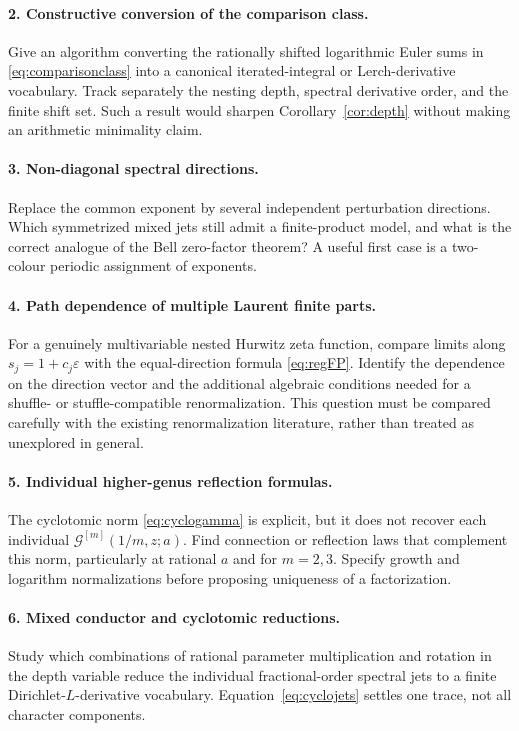 \documentclass[11pt]{article}
\numberwithin{equation}{section}
\theoremstyle{definition}\newtheorem{definition}[theorem]{Definition}
\theoremstyle{remark}\newtheorem{remark}[theorem]{Remark}
\newcommand{\G}{\mathcal G}\newcommand{\F}{\mathfrak F}
\newcommand{\eps}{\varepsilon}
\begin{document}
\paragraph{2. Constructive conversion of the comparison class.}
Give an algorithm converting the rationally shifted logarithmic Euler
sums in \eqref{eq:comparisonclass} into a canonical iterated-integral or
Lerch-derivative vocabulary. Track separately the nesting depth, spectral
derivative order, and the finite shift set. Such a result would sharpen
Corollary~\ref{cor:depth} without making an arithmetic minimality claim.

\paragraph{3. Non-diagonal spectral directions.}
Replace the common exponent by several independent perturbation directions.
Which symmetrized mixed jets still admit a finite-product model, and what
is the correct analogue of the Bell zero-factor theorem? A useful first
case is a two-colour periodic assignment of exponents.

\paragraph{4. Path dependence of multiple Laurent finite parts.}
For a genuinely multivariable nested Hurwitz zeta function, compare limits
along $s_j=1+c_j\eps$ with the equal-direction formula
\eqref{eq:regFP}. Identify the dependence on the direction vector and the
additional algebraic conditions needed for a shuffle- or stuffle-compatible
renormalization. This question must be compared carefully with the existing
renormalization literature, rather than treated as unexplored in general.

\paragraph{5. Individual higher-genus reflection formulas.}
The cyclotomic norm \eqref{eq:cyclogamma} is explicit, but it does not
recover each individual $\G^{[m]}(1/m,z;a)$. Find connection or reflection
laws that complement this norm, particularly at rational $a$ and for
$m=2,3$. Specify growth and logarithm normalizations before proposing
uniqueness of a factorization.

\paragraph{6. Mixed conductor and cyclotomic reductions.}
Study which combinations of rational parameter multiplication and rotation
in the depth variable reduce the individual fractional-order spectral jets
to a finite Dirichlet-$L$-derivative vocabulary. Equation~\eqref{eq:cyclojets}
settles one trace, not all character components.
\end{document}
